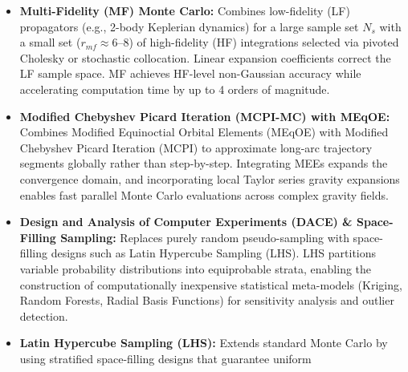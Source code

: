 \documentclass[
  letterpaper,
  DIV=11,
  numbers=noendperiod,
  oneside]{scrartcl}
\providecommand{\tightlist}{%
  \setlength{\itemsep}{0pt}\setlength{\parskip}{0pt}}
\begin{document}
\begin{itemize}
  \begin{itemize}
  \tightlist
  \item
    \textbf{Differential Algebra Monte Carlo (DAMC-\(k\)):} Replaces
    pointwise numerical ODE integration with rapid algebraic evaluation
    of a high-order Taylor series expansion using State Transition
    Tensors (STT)
  \item
    \textbf{Polynomial Chaos Expansion Monte Carlo (PCE-MC):} Uses
    orthogonal polynomial expansions to maintain linear computational
    complexity relative to input dimension
  \item
    \textbf{Dual-Number Taylor Polynomial Maps:} Encodes trajectory
    sensitivities to initial state perturbations and time of closest
    approach, achieving computational speedups of \(100\times\) to
    \(300\times\) when embedded in Cross-Entropy Importance Sampling
  \end{itemize}
\item
  \textbf{Multi-Fidelity (MF) Monte Carlo:} Combines low-fidelity (LF)
  propagators (e.g., 2-body Keplerian dynamics) for a large sample set
  \(N_s\) with a small set (\(r_{mf} \approx 6\text{--}8\)) of
  high-fidelity (HF) integrations selected via pivoted Cholesky or
  stochastic collocation. Linear expansion coefficients correct the LF
  sample space. MF achieves HF-level non-Gaussian accuracy while
  accelerating computation time by up to 4 orders of magnitude.
\item
  \textbf{Modified Chebyshev Picard Iteration (MCPI-MC) with MEqOE:}
  Combines Modified Equinoctial Orbital Elements (MEqOE) with Modified
  Chebyshev Picard Iteration (MCPI) to approximate long-arc trajectory
  segments globally rather than step-by-step. Integrating MEEs expands
  the convergence domain, and incorporating local Taylor series gravity
  expansions enables fast parallel Monte Carlo evaluations across
  complex gravity fields.
\item
  \textbf{Design and Analysis of Computer Experiments (DACE) \&
  Space-Filling Sampling:} Replaces purely random pseudo-sampling with
  space-filling designs such as Latin Hypercube Sampling (LHS). LHS
  partitions variable probability distributions into equiprobable
  strata, enabling the construction of computationally inexpensive
  statistical meta-models (Kriging, Random Forests, Radial Basis
  Functions) for sensitivity analysis and outlier detection.
\item
  \textbf{Latin Hypercube Sampling (LHS):} Extends standard Monte Carlo
  by using stratified space-filling designs that guarantee uniform

\end{itemize}
\end{document}

